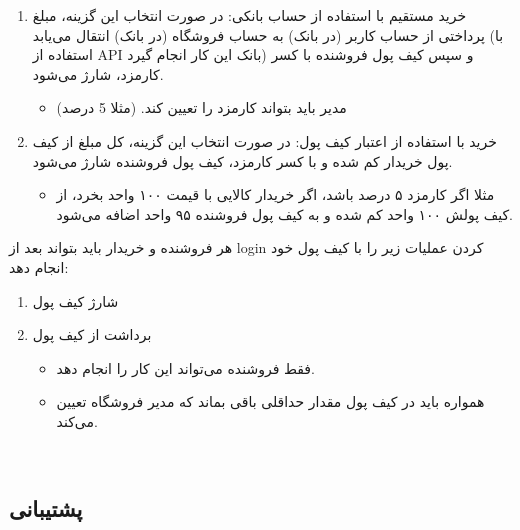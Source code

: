 \documentclass[]{article}
\begin{document}
\begin{enumerate}

\item
خرید مستقیم با  استفاده از حساب بانکی: در صورت انتخاب این گزینه، مبلغ پرداختی از حساب کاربر (در بانک) به حساب فروشگاه (در بانک) انتقال می‌یابد (با استفاده از API بانک این کار انجام گیرد) و سپس کیف پول فروشنده با کسر کارمزد، شارژ‌ می‌شود.

\begin{itemize}[label=$\blacksquare$]
\item
مدیر باید بتواند کارمزد را تعیین کند. (مثلا 5 درصد)
\end{itemize}


\item
خرید با استفاده از اعتبار کیف پول:‌ در صورت انتخاب این گزینه، کل مبلغ از کیف پول خریدار کم شده و با کسر کارمزد، کیف پول فروشنده شارژ می‌شود.

\begin{itemize}[label=$\blacksquare$]
\item
مثلا اگر کارمزد ۵ درصد باشد، اگر خریدار کالایی با قیمت ۱۰۰ واحد بخرد، از کیف پولش ۱۰۰ واحد کم شده و به کیف پول فروشنده ۹۵ واحد اضافه می‌شود.
\end{itemize}

\end{enumerate}


هر فروشنده و خریدار باید بتواند بعد از login کردن عملیات زیر را با کیف پول خود انجام دهد:

\begin{enumerate}


\item
شارژ کیف پول

\item
برداشت از کیف پول

\begin{itemize}[label=$\blacksquare$]
\item
فقط فروشنده می‌تواند این کار را انجام دهد.

\item
همواره باید در کیف پول مقدار حداقلی باقی بماند که مدیر فروشگاه تعیین می‌کند.

\end{itemize}

\end{enumerate}



 \Large \textbf{\\
}
\subsection*{{\titr پشتیبانی}}
\end{document}

